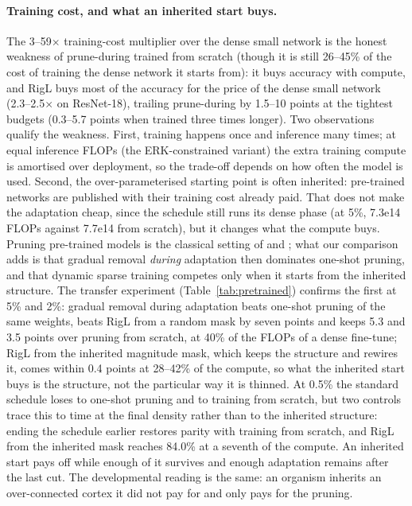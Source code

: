 \documentclass[11pt]{article}
\begin{document}
\paragraph{Training cost, and what an inherited start buys.} The 3--59$\times$ training-cost multiplier over the dense small
network is the honest weakness of prune-during trained from scratch (though it is still 26--45\% of the cost of training the
dense network it starts from): it buys accuracy with compute, and RigL buys most of the
accuracy for the price of the dense small network (2.3--2.5$\times$ on ResNet-18), trailing prune-during by 1.5--10 points
at the tightest budgets (0.3--5.7 points when trained three times longer). Two observations qualify the weakness. First, training happens once and inference many times; at
equal inference FLOPs (the ERK-constrained variant) the extra training compute is amortised over deployment, so the trade-off
depends on how often the model is used. Second, the over-parameterised starting point is often inherited: pre-trained
networks are published with their training cost already paid. That does not make the adaptation cheap, since the schedule
still runs its dense phase (at 5\%, 7.3e14 FLOPs against 7.7e14 from scratch), but it changes what the compute buys. Pruning
pre-trained models is the classical setting of \citet{han2015} and
\citet{zhu2017}; what our comparison adds is that gradual removal \emph{during} adaptation then dominates one-shot pruning,
and that dynamic sparse training competes only when it starts from the inherited structure. The transfer experiment
(Table~\ref{tab:pretrained}) confirms the first at 5\% and 2\%: gradual removal during adaptation beats one-shot pruning of
the same weights, beats RigL from a random mask by seven points and keeps 5.3 and 3.5 points over pruning from scratch, at
40\% of the FLOPs of a dense fine-tune; RigL from the inherited magnitude mask, which keeps the structure and rewires it,
comes within 0.4 points at 28--42\% of the compute, so what the inherited start buys is the structure, not the particular
way it is thinned. At 0.5\% the standard schedule loses to one-shot pruning and to training from scratch, but two controls
trace this to time at the final density rather than to the inherited structure: ending the schedule earlier restores parity
with training from scratch, and RigL from the inherited mask reaches 84.0\% at a seventh of the compute. An inherited start
pays off while enough of it survives and enough adaptation remains after the last cut. The developmental reading is the same: an organism inherits an over-connected
cortex it did not pay for and only pays for the pruning.
\end{document}
